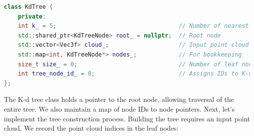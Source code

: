 \begin{lstlisting}[language=c++,caption=src/ch5/kdtree.h]
class KdTree {
	private:
	int k_ = 5;                                   // Number of nearest neighbors for KNN
	std::shared_ptr<KdTreeNode> root_ = nullptr;  // Root node
	std::vector<Vec3f> cloud_;                    // Input point cloud
	std::map<int, KdTreeNode*> nodes_;            // For bookkeeping
	size_t size_ = 0;                             // Number of leaf nodes
	int tree_node_id_ = 0;                        // Assigns IDs to K-d tree nodes
};
\end{lstlisting}

The K-d tree class holds a pointer to the root node, allowing traversal of the entire tree. We also maintain a map of node IDs to node pointers. Next, let's implement the tree construction process. Building the tree requires an input point cloud. We record the point cloud indices in the leaf nodes:

